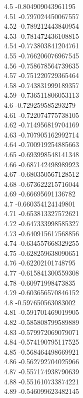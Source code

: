 {4.5	-0.804909043961195\\
4.51	-0.797024450067557\\
4.52	-0.789212443840954\\
4.53	-0.781472436108815\\
4.54	-0.773803841204761\\
4.55	-0.766206076967545\\
4.56	-0.758678564739635\\
4.57	-0.751220729365464\\
4.58	-0.743831999189357\\
4.59	-0.736511806053113\\
4.6	-0.729259585293279\\
4.61	-0.722074775738105\\
4.62	-0.714956819704169\\
4.63	-0.707905162992714\\
4.64	-0.700919254885663\\
4.65	-0.693998548141348\\
4.66	-0.687142498989923\\
4.67	-0.680350567128512\\
4.68	-0.673622215716044\\
4.69	-0.66695691136782\\
4.7	-0.660354124149801\\
4.71	-0.653813327572621\\
4.72	-0.647333998585327\\
4.73	-0.640915617568856\\
4.74	-0.634557668329255\\
4.75	-0.628259638090651\\
4.76	-0.62202101748795\\
4.77	-0.615841300559308\\
4.78	-0.60971998473835\\
4.79	-0.603656570846152\\
4.8	-0.597650563083002\\
4.81	-0.591701469019905\\
4.82	-0.585808799589889\\
4.83	-0.579972069079071\\
4.84	-0.574190795117525\\
4.85	-0.568464498669921\\
4.86	-0.562792704025966\\
4.87	-0.557174938790639\\
4.88	-0.551610733874221\\
4.89	-0.546099623482145\\
}
